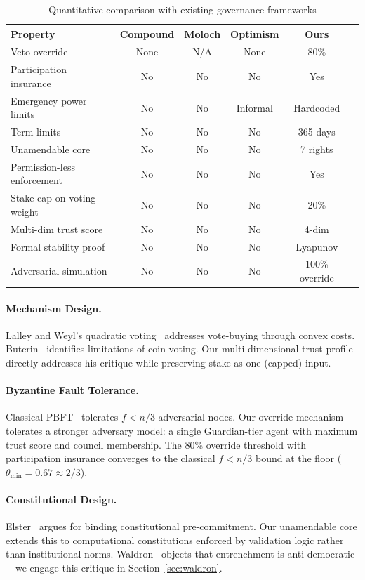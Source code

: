 \documentclass[11pt,a4paper]{article}
\begin{document}
\begin{table}[h]
\centering
\caption{Quantitative comparison with existing governance frameworks}
\label{tab:comparison}
\small
\begin{tabular}{lccccc}
\toprule
\textbf{Property} & \textbf{Compound} & \textbf{Moloch} & \textbf{Optimism} & \textbf{Ours} \\
\midrule
Veto override & None & N/A & None & 80\% \\
Participation insurance & No & No & No & Yes \\
Emergency power limits & No & No & Informal & Hardcoded \\
Term limits & No & No & No & 365 days \\
Unamendable core & No & No & No & 7 rights \\
Permission-less enforcement & No & No & No & Yes \\
Stake cap on voting weight & No & No & No & 20\% \\
Multi-dim trust score & No & No & No & 4-dim \\
Formal stability proof & No & No & No & Lyapunov \\
Adversarial simulation & No & No & No & 100\% override \\
\bottomrule
\end{tabular}
\end{table}

\paragraph{Mechanism Design.} Lalley and Weyl's quadratic voting~\cite{lalley} addresses vote-buying through convex costs. Buterin~\cite{buterin2021} identifies limitations of coin voting. Our multi-dimensional trust profile directly addresses his critique while preserving stake as one (capped) input.

\paragraph{Byzantine Fault Tolerance.} Classical PBFT~\cite{castro} tolerates $f < n/3$ adversarial nodes. Our override mechanism tolerates a stronger adversary model: a single Guardian-tier agent with maximum trust score and council membership. The 80\% override threshold with participation insurance converges to the classical $f < n/3$ bound at the floor ($\theta_{\min} = 0.67 \approx 2/3$).

\paragraph{Constitutional Design.} Elster~\cite{elster} argues for binding constitutional pre-commitment. Our unamendable core extends this to computational constitutions enforced by validation logic rather than institutional norms. Waldron~\cite{waldron} objects that entrenchment is anti-democratic---we engage this critique in Section~\ref{sec:waldron}.
\end{document}
